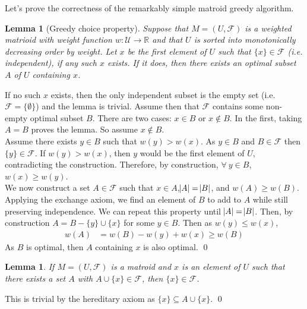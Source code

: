 \documentclass[10pt]{article}
\theoremstyle{plain}
\newtheorem{lem}[thm]{Lemma}
\theoremstyle{definition}
\newcommand{\RR}{\mathbb{R}}
\newcommand{\UU}{\mathcal{U}}
\numberwithin{equation}{section}
\numberwithin{figure}{section}
\begin{document}
\noindent Let's prove the correctness of the remarkably simple matroid greedy algorithm.

\begin{lem}[Greedy choice property]
Suppose that $M = (U, \mathcal{F})$ is a weighted matrioid with weight function $w: \UU \rightarrow \RR$ and that $U$ is sorted into monotonically decreasing order by weight. Let $x$ be the first element of $U$ such that $\{x\} \in \mathcal{F}$ (i.e. independent), if any such $x$ exists. If it does, then there exists an optimal subset $A$ of $U$ containing $x$. \label{greedy-choice-property}
\end{lem}

\proof If no such $x$ exists, then the only independent subset is the empty set (i.e. $\mathcal{F} = \{\emptyset\}$) and the lemma is trivial. Assume then that $\mathcal{F}$ contains some non-empty optimal subset $B$. There are two cases: $x \in B$ or $x \notin B$. In the first, taking $A = B$ proves the lemma. So assume $x \notin B$. \\

\noindent Assume there exists $y \in B$ such that $w(y) > w(x)$. As $y \in B$ and $B \in \mathcal{F}$ then $\{y\} \in \mathcal{F}$. If $w(y) > w(x)$, then $y$ would be the first element of $U$, contradicting the construction. Therefore, by construction, $\forall \ y \in B$, $w(x) \geq w(y)$. \\

\noindent We now construct a set $A \in \mathcal{F}$ such that $x \in A$,$\abs{A} = \abs{B}$, and $w(A) \geq w(B)$. Applying the exchange axiom, we find an element of $B$ to add to $A$ while still preserving independence. We can repeat this property until $\abs{A} = \abs{B}$. Then, by construction $A = B - \{y\} \cup \{x\}$ for some $y \in B$. Then as $w(y) \leq w(x)$,
\begin{equation}
\begin{aligned}
w(A) &= w(B) - w(y) + w(x) \geq w(B)
\end{aligned}
\end{equation}
\noindent As $B$ is optimal, then $A$ containing $x$ is also optimal. \qed

\begin{lem}
If $M = (U, \mathcal{F})$ is a matroid and $x$ is an element of $U$ such that there exists a set $A$ with $A \cup \{x\} \in \mathcal{F}$, then $\{x\} \in \mathcal{F}$. \label{greedy-passover}
\end{lem}

\proof This is trivial by the hereditary axiom as $\{x\} \subseteq A \cup \{x\}$. \qed
\end{document}
